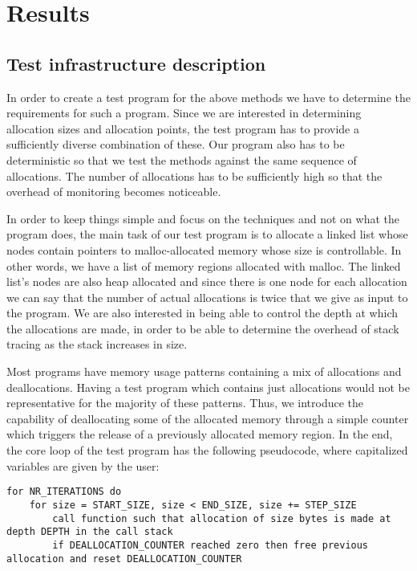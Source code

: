 \chapter{Results}
\label{chapter:results}

\section{Test infrastructure description}
\label{section:testprogram}

In order to create a test program for the above methods we have to determine the requirements for such a program. Since we are interested in determining allocation sizes and allocation points, the test program has to provide a sufficiently diverse combination of these. Our program also has to be deterministic so that we test the methods against the same sequence of allocations. The number of allocations has to be sufficiently high so that the overhead of monitoring becomes noticeable.

In order to keep things simple and focus on the techniques and not on what the program does, the main task of our test program is to allocate a linked list whose nodes contain pointers to malloc-allocated memory whose size is controllable. In other words, we have a list of memory regions allocated with malloc. The linked list's nodes are also heap allocated and since there is one node for each allocation we can say that the number of actual allocations is twice that we give as input to the program. We are also interested in being able to control the depth at which the allocations are made, in order to be able to determine the overhead of stack tracing as the stack increases in size.

Most programs have memory usage patterns containing a mix of allocations and deallocations. Having a test program which contains just allocations would not be representative for the majority of these patterns. Thus, we introduce the capability of deallocating some of the allocated memory through a simple counter which triggers the release of a previously allocated memory region. In the end, the core loop of the test program has the following pseudocode, where capitalized variables are given by the user:

\begin{lstlisting}[label=pseudotest, caption=Test program core loop]
for NR_ITERATIONS do
	for size = START_SIZE, size < END_SIZE, size += STEP_SIZE
		call function such that allocation of size bytes is made at depth DEPTH in the call stack
		if DEALLOCATION_COUNTER reached zero then free previous allocation and reset DEALLOCATION_COUNTER
\end{lstlisting}

